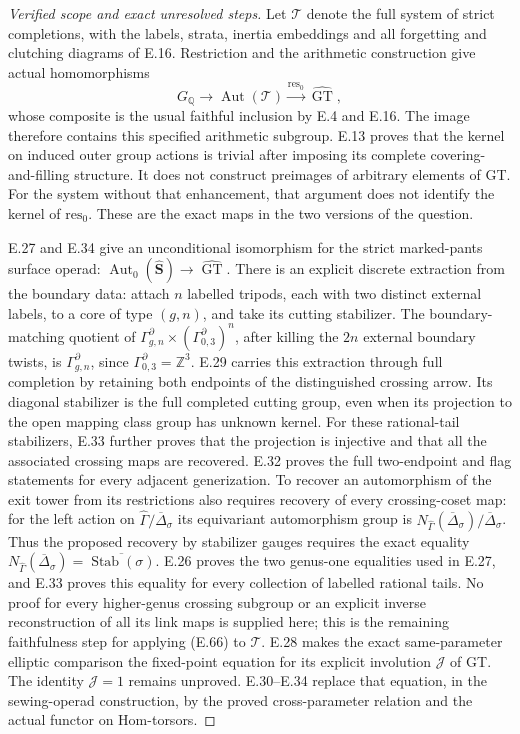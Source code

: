 \begin{proof}[Verified scope and exact unresolved steps]
Let $\mathcal T$ denote the full system of strict
completions, with the labels, strata, inertia embeddings
and all forgetting and clutching diagrams of E.16.
Restriction and the arithmetic construction give actual
homomorphisms
\[
 G_{\mathbb Q}\longrightarrow\operatorname{Aut}(\mathcal T)
       \xrightarrow{\mathrm{res}_0}\widehat{\operatorname{GT}},
                                                               \tag{E.52}
\]
whose composite is the usual faithful inclusion by E.4
and E.16.  The image therefore contains this specified
arithmetic subgroup.  E.13 proves that the kernel on
induced outer group actions is trivial after imposing
its complete covering-and-filling structure.  It does
not construct preimages of arbitrary elements of GT.
For the system without that enhancement, that argument
does not identify the kernel of $\mathrm{res}_0$.
These are the exact maps in the two versions of the
question.

E.27 and E.34 give an unconditional isomorphism
for the strict marked-pants surface operad:
$\operatorname{Aut}_0(\widehat{\mathbf S})\to
\widehat{\operatorname{GT}}$.
There is an explicit discrete extraction from the
boundary data: attach $n$ labelled tripods, each
with two distinct external labels, to a core of
type $(g,n)$, and take its cutting stabilizer.
The boundary-matching quotient of
$\Gamma_{g,n}^{\partial}\times
(\Gamma_{0,3}^{\partial})^n$, after killing the
$2n$ external boundary twists, is
$\Gamma_{g,n}^{\partial}$, since
$\Gamma_{0,3}^{\partial}=\mathbb Z^3$.
E.29 carries this extraction through full completion
by retaining both endpoints of the distinguished
crossing arrow.  Its diagonal stabilizer is the
full completed cutting group, even when its
projection to the open mapping class group has
unknown kernel. For these rational-tail stabilizers,
E.33 further proves that the projection is injective
and that all the associated crossing maps are
recovered. E.32 proves the full two-endpoint and
flag statements for every adjacent generization.
To recover an automorphism of the exit tower
from its restrictions also requires recovery of
every crossing-coset map: for the left action on
$\widehat\Gamma/\overline\Delta_\sigma$ its
equivariant automorphism group is
$N_{\widehat\Gamma}(\overline\Delta_\sigma)/
\overline\Delta_\sigma$.
Thus the proposed recovery by stabilizer gauges
requires the exact equality
$N_{\widehat\Gamma}(\overline\Delta_\sigma)=
\overline{\operatorname{Stab}(\sigma)}$.
E.26 proves the two genus-one equalities used
in E.27, and E.33 proves this equality for
every collection of labelled rational tails.
No proof for every higher-genus
crossing subgroup or an explicit inverse
reconstruction of all its link maps is supplied
here; this is the remaining faithfulness step
for applying (E.66) to $\mathcal T$.
E.28 makes the exact same-parameter elliptic
comparison the fixed-point equation for its
explicit involution $\mathcal J$ of GT.
The identity $\mathcal J=1$ remains unproved.
E.30--E.34 replace that equation, in the
sewing-operad construction, by the proved
cross-parameter relation and the actual
functor on Hom-torsors.


\end{proof}

